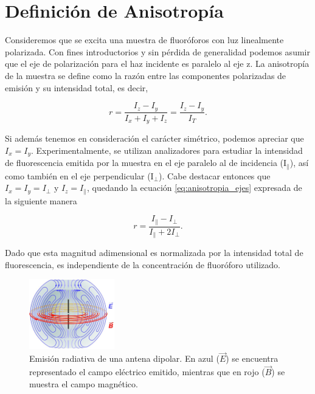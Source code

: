 
\section{Definición de Anisotropía}

Consideremos que se excita una muestra de fluoróforos con luz linealmente polarizada. Con fines introductorios y sin pérdida de generalidad podemos asumir que el eje de polarización para el haz incidente es paralelo al eje z. La anisotropía de la muestra se define como la razón entre las componentes polarizadas de emisión y su intensidad total, es decir,

\begin{equation}
    r = \frac{I_{z} - I_{y}}{I_{x} + I_{y} + I_{z}} = \frac{I_{z} - I_{y}}{I_{T}}.
    \label{eq:anisotropia_ejes}
\end{equation}

\noindent Si además tenemos en consideración el carácter simétrico\cite{Weber1965}, podemos apreciar que $I_x = I_y$. Experimentalmente, se utilizan analizadores para estudiar la intensidad de fluorescencia emitida por la muestra en el eje paralelo al de incidencia (I$_{\parallel}$), así como también en el eje perpendicular (I$_{\perp}$). Cabe destacar entonces que $I_x = I_y = I_{\perp}$ y $I_z = I_{\parallel}$, quedando la ecuación \ref{eq:anisotropia_ejes} expresada de la siguiente manera

\begin{equation}
    r = \frac{I_{\parallel} - I_{\perp}}{I_{\parallel} + 2 I_{\perp}}.
    \label{eq:anisotropia}
\end{equation}

\noindent Dado que esta magnitud adimensional es normalizada por la intensidad total de fluorescencia, es independiente de la concentración de fluoróforo utilizado.

\begin{figure}
    \centering
    \includegraphics[width=0.33\textwidth]{./img/AntenaDipolar.jpg}
    \caption{Emisión radiativa de una antena dipolar. En azul ($\vec{E}$) se encuentra representado el campo eléctrico emitido, mientras que en rojo ($\vec{B}$) se muestra el campo magnético.}
    \label{fig:AntenaDipolar}
\end{figure}


